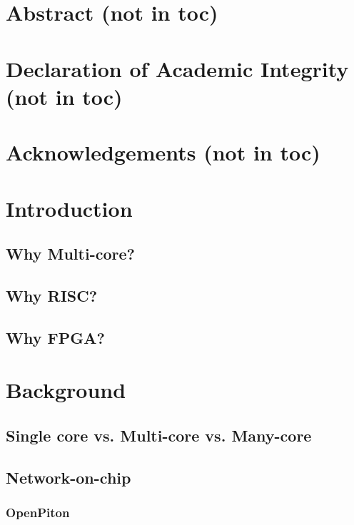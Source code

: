 \documentclass[11pt,a4paper]{report}
\begin{document}
\newpage
\renewcommand*\contentsname{Table of Contents}
{%
\tableofcontents
\newpage

\vspace{1cm}
\cite{openpiton}
\cite{satish2009designing}
\cite{binet2010harnessing}

\newpage

\chapter{Abstract (not in toc)}
\chapter{Declaration of Academic Integrity (not in toc)}
\chapter{Acknowledgements (not in toc)}

\chapter{Introduction}
{%
\startcontents[chapters]
}
    \section{Why Multi-core?}
    \section{Why RISC?}
    \section{Why FPGA?}
    
\chapter{Background}
{%
\startcontents[chapters]
}
    \section{Single core vs. Multi-core vs. Many-core}
    \section{Network-on-chip}
        \subsection{OpenPiton}
}
\end{document}
